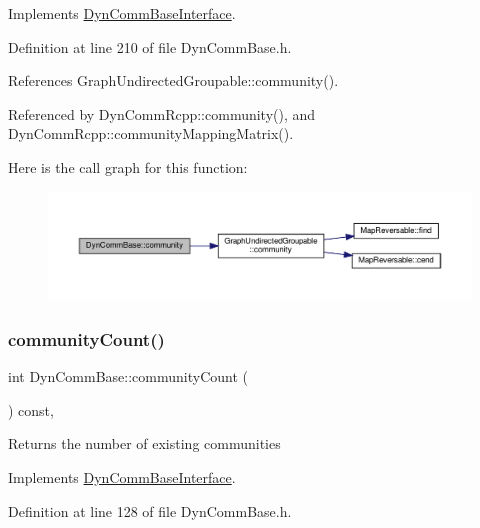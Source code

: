 Implements \hyperlink{classDynCommBaseInterface_a9453a177580033aa1d4d9f165350ceba}{Dyn\+Comm\+Base\+Interface}.



Definition at line 210 of file Dyn\+Comm\+Base.\+h.



References Graph\+Undirected\+Groupable\+::community().



Referenced by Dyn\+Comm\+Rcpp\+::community(), and Dyn\+Comm\+Rcpp\+::community\+Mapping\+Matrix().

Here is the call graph for this function\+:
\nopagebreak
\begin{figure}[H]
\begin{center}
\leavevmode
\includegraphics[width=350pt]{classDynCommBase_a651753518a2de4ea52caea518e74d878_cgraph}
\end{center}
\end{figure}
\mbox{\label{classDynCommBase_add5d1d59a3f20b4ba039342b31551fb3}} 
\subsubsection{\texorpdfstring{community\+Count()}{communityCount()}}
{\footnotesize\ttfamily int Dyn\+Comm\+Base\+::community\+Count (\begin{DoxyParamCaption}{ }\end{DoxyParamCaption}) const\hspace{0.3cm}{\ttfamily [inline]}, {\ttfamily [virtual]}}

\begin{DoxyReturn}{Returns}
the number of existing communities 
\end{DoxyReturn}


Implements \hyperlink{classDynCommBaseInterface_aa61588ce385fd66855e17747cf188a85}{Dyn\+Comm\+Base\+Interface}.



Definition at line 128 of file Dyn\+Comm\+Base.\+h.



